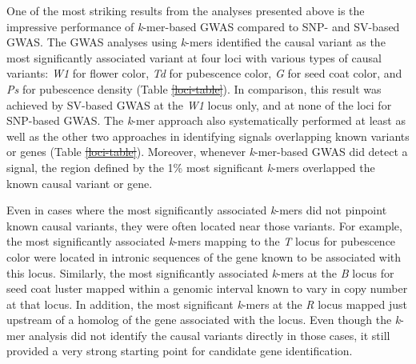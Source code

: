 \documentclass{article}
\providecommand{\DIFaddtex}[1]{{\protect\color{blue}\uwave{#1}}} %
\providecommand{\DIFdeltex}[1]{{\protect\color{red}\sout{#1}}}                      %
\providecommand{\DIFaddbegin}{} %
\providecommand{\DIFaddend}{} %
\providecommand{\DIFdelbegin}{} %
\providecommand{\DIFdelend}{} %
\providecommand{\DIFadd}[1]{\texorpdfstring{\DIFaddtex{#1}}{#1}} %
\providecommand{\DIFdel}[1]{\texorpdfstring{\DIFdeltex{#1}}{}} %
\newcommand{\DIFscaledelfig}{0.5}
\newlength{\DIFdelgraphicswidth} %
\newlength{\DIFdelgraphicsheight} %
\newcommand{\DIFaddincludegraphics}[2][]{{\color{blue}\fbox{\DIFOincludegraphics[#1]{#2}}}} %
\newcommand{\DIFdelincludegraphics}[2][]{%
\sbox{\DIFdelgraphicsbox}{\DIFOincludegraphics[#1]{#2}}%
\settoboxwidth{\DIFdelgraphicswidth}{\DIFdelgraphicsbox} %
\settoboxtotalheight{\DIFdelgraphicsheight}{\DIFdelgraphicsbox} %
\scalebox{\DIFscaledelfig}{%
\parbox[b]{\DIFdelgraphicswidth}{\usebox{\DIFdelgraphicsbox}\\[-\baselineskip] \rule{\DIFdelgraphicswidth}{0em}}\llap{\resizebox{\DIFdelgraphicswidth}{\DIFdelgraphicsheight}{%
\setlength{\unitlength}{\DIFdelgraphicswidth}%
\begin{picture}(1,1)%
\thicklines\linethickness{2pt} %
{\color[rgb]{1,0,0}\put(0,0){\framebox(1,1){}}}%
{\color[rgb]{1,0,0}\put(0,0){\line( 1,1){1}}}%
{\color[rgb]{1,0,0}\put(0,1){\line(1,-1){1}}}%
\end{picture}%
}\hspace*{3pt}}} %
} %
\DeclareRobustCommand{\DIFaddbegin}{\DIFOaddbegin \let\includegraphics\DIFaddincludegraphics} %
\DeclareRobustCommand{\DIFaddend}{\DIFOaddend \let\includegraphics\DIFOincludegraphics} %
\DeclareRobustCommand{\DIFdelbegin}{\DIFOdelbegin \let\includegraphics\DIFdelincludegraphics} %
\DeclareRobustCommand{\DIFdelend}{\DIFOaddend \let\includegraphics\DIFOincludegraphics} %
\begin{document}
\DIFdelend One of the most striking results from the analyses presented above is the
impressive performance of \emph{k}-mer-based GWAS compared to SNP- and SV-based
GWAS. The GWAS analyses using \emph{k}-mers identified the causal variant as
the most significantly associated variant at four loci with various types of
causal variants: \emph{W1} for flower color, \emph{Td} for pubescence color,
\emph{G} for seed coat color, and \emph{Ps} for pubescence density (Table
\DIFdelbegin \DIFdel{\ref{loci-table}}\DIFdelend \DIFaddbegin \DIFadd{1}\DIFaddend ). In comparison, this result was achieved by SV-based GWAS at
the \textit{W1} locus only, and at none of the loci for SNP-based GWAS.
The \textit{k}-mer approach also systematically performed at least as well as
the other two approaches in identifying signals overlapping known variants or
genes (Table \DIFdelbegin \DIFdel{\ref{loci-table}}\DIFdelend \DIFaddbegin \DIFadd{1}\DIFaddend ). Moreover, whenever \textit{k}-mer-based GWAS
did detect a signal, the region defined by the 1\% most significant
\textit{k}-mers overlapped the known causal variant or gene. 

Even in cases where the most significantly associated \emph{k}-mers did not
pinpoint known causal variants, they were often located near those variants.
For example, the most significantly associated \emph{k}-mers mapping to the
\emph{T} locus for pubescence color were located in intronic sequences of the
gene known to be associated with this locus.  Similarly, the most significantly
associated \emph{k}-mers at the \emph{B} locus for seed coat luster mapped
within a genomic interval known to vary in copy number at that locus. In
addition, the most significant \emph{k}-mers at the \emph{R} locus mapped just
upstream of a homolog of the gene associated with the locus. Even though the
\emph{k}-mer analysis did not identify the causal variants directly in those
cases, it still provided a very strong starting point for candidate gene
identification.
\end{document}
